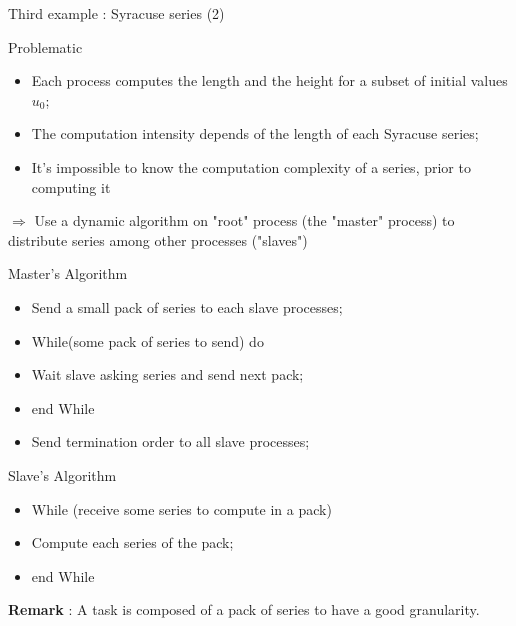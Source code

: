\documentclass[compress,10pt,aspectratio=169]{beamer}
\begin{document}
\begin{frame}[fragile]{Third example : Syracuse series (2)}
    \scriptsize
    \begin{block}{\small Problematic}
        \begin{itemize}
            \item Each process computes the length and the height for a subset of initial values $u_{0}$;
            \item The computation intensity depends of the length of each Syracuse series;
            \item It's impossible to know the computation complexity of a series, prior to computing it
        \end{itemize}
        $\Rightarrow$ Use a dynamic algorithm on "root" process (the "master" process) to distribute series among other processes ("slaves")
    \end{block}

    \begin{multicols}{2}
        \begin{exampleblock}{\small Master's Algorithm}
            \begin{itemize}
                \item Send a small pack of series to each slave processes;
                \item While(some pack of series to send) do 
                \item \hspace*{2mm}Wait slave asking series and send next pack;
                \item end While
                \item Send termination order to all slave processes;
            \end{itemize}
        \end{exampleblock}

        \begin{exampleblock}{\small Slave's Algorithm}
            \begin{itemize}
                \item While (receive some series to compute in a pack)
                \item \hspace*{2mm}Compute each series of the pack;
                \item end While
            \end{itemize}
        \end{exampleblock}
    \end{multicols}

    \textbf{Remark} : A task is composed of a pack of series to have a good granularity.

\end{frame}
\end{document}
